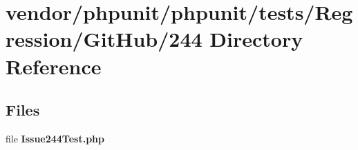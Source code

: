\section{vendor/phpunit/phpunit/tests/\+Regression/\+Git\+Hub/244 Directory Reference}
\label{dir_cd1f66bcf070acba7f7ae4a74281c1bb}
\subsection*{Files}
\begin{DoxyCompactItemize}
\item 
file {\bf Issue244\+Test.\+php}
\end{DoxyCompactItemize}
